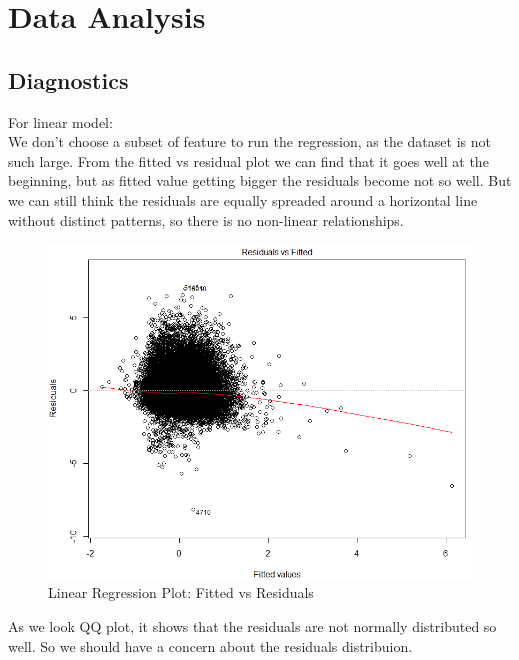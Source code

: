 \documentclass[11pt]{article}
\begin{document}
\section{Data Analysis}
\subsection{Diagnostics}
For linear model: \\
    We don't choose a subset of feature to run the regression, as the dataset is not such large. From the fitted vs residual plot we can find that it goes well at the beginning, but as fitted value getting bigger the residuals become not so well. But we can still think the residuals are equally spreaded around a horizontal line without distinct patterns, so there is no non-linear relationships.   \\
    
    \begin{figure}[h]
        \centering
        \includegraphics[width=0.7\linewidth]{linear_fvsr.png}
        \caption{Linear Regression Plot: Fitted vs Residuals}
    \end{figure}  
    
    As we look QQ plot, it shows that the residuals are not normally distributed so well. So we should have a concern about the residuals distribuion.\\
    
\end{document}
